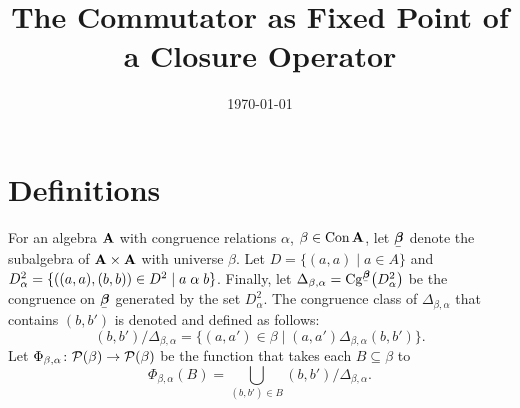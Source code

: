 \documentclass[11pt]{amsart}
\numberwithin{equation}{section}
\theoremstyle{plain}
\theoremstyle{definition}
\begin{document}
\title[Commutator as Fixed Point]{The Commutator as Fixed Point of a Closure Operator}
\date{\today}
\address{University of Hawaii}


\maketitle

\renewcommand{\etaR}{\ensuremath{\eta}}



\section{Definitions}
\label{sec:defs}
For an algebra $\mathbf{A}$ with congruence relations $\alpha$, $\beta\in \operatorname{Con}\mathbf{A}$,
let $\bbeta$ denote the subalgebra of $\mathbf{A}\times \mathbf{A}$ with universe 
$\beta$.
Let $D = \{(a,a) \mid a\in A\}$ and 
$D^2_\alpha = \{((a,a), (b,b)) \in D^2 \mid a\mathrel{\alpha} b\}$.
Finally, let
$\Delta_{\beta, \alpha} = \Cg^{\bbeta}\bigl(D^2_\alpha \bigr)$ be
the congruence on $\bbeta$ generated by the set $D^2_\alpha$.
The congruence class of $\Delta_{\beta, \alpha}$ that contains $(b,b')$ is
denoted and defined as follows:
\[
(b,b')/\Delta_{\beta,\alpha} = \{(a,a') \in \beta \mid (a,a') \mathrel{\Delta_{\beta,\alpha}} (b,b')\}.
\]
Let $\Phi_{\beta, \alpha} \colon \mathcal{P}(\beta) \to \mathcal{P}(\beta)$ be the function that
takes each $B \subseteq \beta$ to
\begin{equation}
  \label{eq:6}
  \Phi_{\beta, \alpha}(B) = \bigcup_{(b,b')\in B} (b,b')/\Delta_{\beta, \alpha}.
\end{equation}
\newcommand{\Phiba}{\ensuremath{\Phi}}
\end{document}
